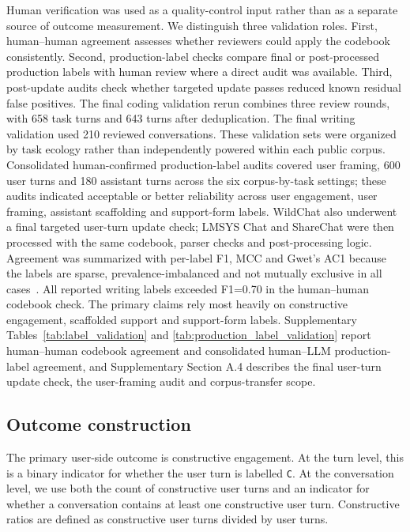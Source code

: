 Human verification was used as a quality-control input rather than as a separate source of outcome measurement. We distinguish three validation roles. First, human--human agreement assesses whether reviewers could apply the codebook consistently. Second, production-label checks compare final or post-processed production labels with human review where a direct audit was available. Third, post-update audits check whether targeted update passes reduced known residual false positives. The final coding validation rerun combines three review rounds, with 658 task turns and 643 turns after deduplication. The final writing validation used 210 reviewed conversations. These validation sets were organized by task ecology rather than independently powered within each public corpus. Consolidated human-confirmed production-label audits covered user framing, 600 user turns and 180 assistant turns across the six corpus-by-task settings; these audits indicated acceptable or better reliability across user engagement, user framing, assistant scaffolding and support-form labels. WildChat also underwent a final targeted user-turn update check; LMSYS Chat and ShareChat were then processed with the same codebook, parser checks and post-processing logic. Agreement was summarized with per-label F1, MCC and Gwet's AC1 because the labels are sparse, prevalence-imbalanced and not mutually exclusive in all cases~\cite{matthews1975comparison,gwet2008computing}. All reported writing labels exceeded F1=0.70 in the human--human codebook check. The primary claims rely most heavily on constructive engagement, scaffolded support and support-form labels. Supplementary Tables~\ref{tab:label_validation} and \ref{tab:production_label_validation} report human--human codebook agreement and consolidated human--LLM production-label agreement, and Supplementary Section A.4 describes the final user-turn update check, the user-framing audit and corpus-transfer scope.

\subsection{Outcome construction}

The primary user-side outcome is constructive engagement. At the turn level, this is a binary indicator for whether the user turn is labelled \texttt{C}. At the conversation level, we use both the count of constructive user turns and an indicator for whether a conversation contains at least one constructive user turn. Constructive ratios are defined as constructive user turns divided by user turns.

